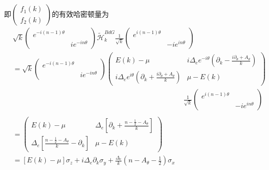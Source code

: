 \documentclass[22pt]{article}
\begin{document}
即$\begin{pmatrix}
	f_1(k)\\
	f_2(k)
\end{pmatrix}$的有效哈密顿量为
\begin{align}
	&
	\sqrt{k}
	\begin{pmatrix}
		e^{-i(n-1)\theta} &\\
		&ie^{-in\theta}
	\end{pmatrix}
	\tilde{\mathcal{H}}_k^{BdG}
	\frac{1}{\sqrt{k}}
	\begin{pmatrix}
		e^{i(n-1)\theta} & \\
		&-ie^{in\theta}
	\end{pmatrix}
	\\ \nonumber	
	&=	\sqrt{k}\begin{pmatrix}
		e^{-i(n-1)\theta} &\\
		&ie^{-in\theta}
	\end{pmatrix}
	\begin{pmatrix}
		E(k)-\mu  & i\Delta_ee^{-i\theta}(\partial_k-\frac{i\partial_{\theta}+A_{\theta}}{k})\\
		i\Delta_ee^{i\theta}(\partial_k+\frac{i\partial_{\theta}+A_{\theta}}{k})
		&  \mu-E(k)
	\end{pmatrix}
\\ \nonumber
& \qquad\qquad \qquad \qquad \qquad \qquad \qquad \qquad \qquad\qquad\qquad\qquad
\frac{1}{\sqrt{k}}
	\begin{pmatrix}
		e^{i(n-1)\theta} & \\
		&-ie^{in\theta}
	\end{pmatrix}\\  \nonumber
	\\ \nonumber
	&=\begin{pmatrix}
		E(k)-\mu &   \Delta_e[\partial_k+\frac{n-\frac{1}{2}-A_{\theta}}{k}] \\
		\Delta_e[\frac{n-\frac{1}{2}-A_{\theta}}{k}-\partial_k] & \mu-E(k)
	\end{pmatrix}
	\\ 
	&=[E(k)-\mu]\sigma_z+i\Delta_e\partial_k\sigma_y+\frac{\Delta_e}{k}(n-A_{\theta}-\frac{1}{2})\sigma_x
\end{align}
\end{document}
